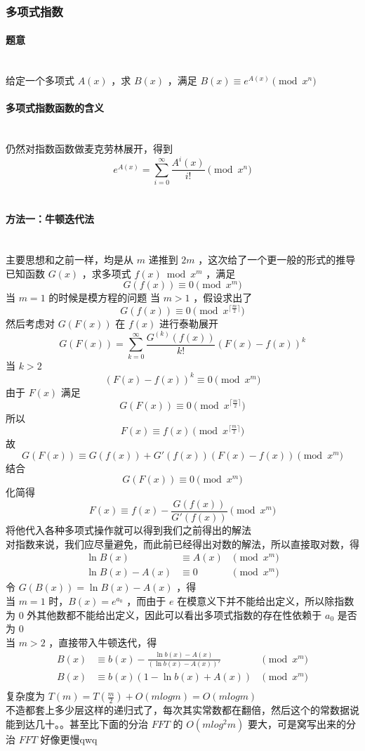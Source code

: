 	\subsubsection{多项式指数}
	\paragraph{题意}~\\
	给定一个多项式 $A(x)$ ，求 $B(x)$ ，满足 $B(x)\equiv e^{A(x)}\pmod{x^n}$
	\paragraph{多项式指数函数的含义}~\\
	仍然对指数函数做麦克劳林展开，得到
	$$
	e^{A(x)}=\sum_{i=0}^{\infty}\frac{A^i(x)}{i!}\pmod{x^n}
	$$\\
	\paragraph{方法一：牛顿迭代法}~\\
	主要思想和之前一样，均是从 $m$ 递推到 $2m$ ，这次给了一个更一般的形式的推导
	已知函数 $G(x)$ ，求多项式 $f(x)\bmod{x^m}$ ，满足
	$$
	G(f(x))\equiv0\pmod{x^m}
	$$
	当 $m=1$ 的时候是模方程的问题
	当 $m>1$ ，假设求出了
	$$
	G(f(x))\equiv0\pmod{x^{\lceil\frac{m}{2} \rceil}}
	$$
	然后考虑对 $G(F(x))$ 在 $f(x)$ 进行泰勒展开
	$$
	G(F(x))=\sum_{k=0}^{\infty} \frac{G^{(k)}(f(x))}{k!}(F(x)-f(x))^k
	$$
	当 $k>2$ 
	$$
	(F(x)-f(x))^k\equiv 0\pmod{x^m}
	$$
	由于 $F(x)$ 满足 
	$$
	G(F(x))\equiv0\pmod{x^{\lceil\frac{m}{2} \rceil}}
	$$
	所以 
	$$
	F(x)\equiv f(x)\pmod{x^{\lceil\frac{m}{2} \rceil}}
	$$
	故
	$$
	G(F(x))\equiv G(f(x))+G'(f(x))(F(x)-f(x))\pmod{x^m}
	$$
	结合
	$$
	G(F(x))\equiv 0\pmod{x^m}
	$$
	化简得
	$$
	F(x)\equiv f(x)-\frac{G(f(x))}{G'(f(x))}\pmod{x^m}
	$$
	将他代入各种多项式操作就可以得到我们之前得出的解法\\
	对指数来说，我们应尽量避免，而此前已经得出对数的解法，所以直接取对数，得
	$$
	\begin{aligned}
	\ln B(x)&\equiv A(x)&\pmod{x^m}\\
	\ln B(x)-A(x)&\equiv 0&\pmod{x^m}
	\end{aligned}
	$$
	令 $G(B(x))=\ln B(x)-A(x)$ ，得\\
	当 $m=1$ 时，$B(x)=e^{a_0}$ ，而由于 $e$ 在模意义下并不能给出定义，所以除指数为 $0$ 外其他数都不能给出定义，因此可以看出多项式指数的存在性依赖于 $a_0$ 是否为 $0$\\
	当 $m>2$ ，直接带入牛顿迭代，得
	$$
	\begin{aligned}
	B(x)&\equiv b(x)-\frac{\ln b(x)-A(x)}{(\ln b(x)-A(x))'}&\pmod{x^m}\\
	B(x)&\equiv b(x)(1-\ln b(x)+A(x)) &\pmod{x^m}\\
	\end{aligned}
	$$
	复杂度为 $T(m)=T(\frac{m}{2})+O(mlogm)=O(mlogm)$ \\
	不造都套上多少层这样的递归式了，每次其实常数都在翻倍，然后这个的常数据说能到达几十。。甚至比下面的分治 $FFT$ 的 $O(mlog^2m)$ 要大，可是窝写出来的分治 $FFT$ 好像更慢qwq\\
